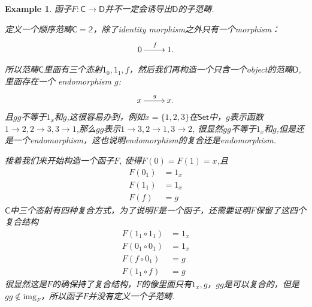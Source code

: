 \documentclass{article}
\newtheorem{example}[theorem]{Example}
\newcommand*{\cat}[1]{\textsf{#1}\xspace}
\begin{document}
\begin{example}
\rm 函子$F: \cat{C} \rightarrow \cat{D}$并不一定会诱导出$\cat{D}$的子范畴.

定义一个顺序范畴$\cat{C}  = \mathbb{2}$，除了identity morphism之外只有一个morphism：
\[\xymatrix{0\ar[r]^f&1.}\]

所以范畴$\cat{C}$里面有三个态射$1_0,1_1,f$，然后我们再构造一个只含一个object的范畴$\cat{D}$,里面存在一个 endomorphism $g$:
\[\xymatrix{x\ar[r]^g&x.}\]
且$gg$不等于$1_x$和$g$,这很容易办到，例如$x=\{1,2,3\}$在$\cat{Set}$中，$g$表示函数$1 \rightarrow 2, 2\rightarrow 3 ,3 \rightarrow 1$,那么$gg$表示$1 \rightarrow 3, 2 \rightarrow 1 , 3 \rightarrow 2$, 很显然$gg$不等于$1_x$和$g$,但是还是一个endomorphism，这也说明endomorphism的复合还是endomorphism.

接着我们来开始构造一个函子$F$, 使得$F(0)=F(1)=x$,且
$$
\begin{aligned}
F(0_1)&=1_x \\ 
F(1_1)&=1_x \\ 
F(f)&=g
\end{aligned}
$$
$\cat{C}$中三个态射有四种复合方式，为了说明$F$是一个函子，还需要证明$F$保留了这四个复合结构
$$
\begin{aligned}
F(1_1 \circ 1_1)&=1_x \\
F(0_1 \circ 0_1)&=1_x \\
F(f \circ 0_1)&=g\\
F(1_1 \circ f)&=g
\end{aligned}
$$
很显然这是$F$的确保持了复合结构，$F$的像里面只有$1_x,g$，$gg$是可以复合的，但是$gg \notin \text{img}_F$，所以函子$F$并没有定义一个子范畴. 
\end{example}
\end{document}
